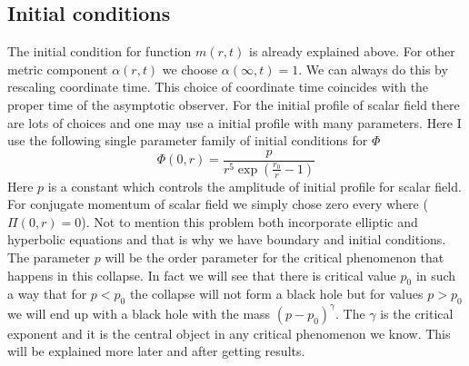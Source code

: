 \documentclass[a4paper,11pt]{article}
\begin{document}
\subsection{Initial conditions}
The initial condition for function $m(r,t)$ is already explained above. For other metric component $\alpha(r,t)$ we choose $\alpha(\infty,t)=1$. We can always do this by rescaling coordinate time. This choice of coordinate time coincides with the proper time of the asymptotic observer. For the initial profile of scalar field there are lots of choices and one may use a initial profile with many parameters. Here I use the following single parameter family of initial conditions for $\Phi$ 
\begin{equation*}
	\Phi(0,r)=\frac{p}{r^5 \exp(\frac{r_0}{r}-1)}
\end{equation*}
Here $p$ is a constant which controls the amplitude of initial profile for scalar field. For conjugate momentum of scalar field we simply chose zero every where ($\Pi(0,r)=0$). Not to mention this problem both incorporate elliptic and hyperbolic equations and that is why we have boundary and initial conditions.
 The parameter $p$ will be the order parameter for the critical phenomenon that happens in this collapse. In fact we will see that there is critical value $p_0$ in such a way that for $p<p_0$ the collapse will not form a black hole but for values $p>p_0$ we will end up with a black hole with the mass $(p-p_0)^\gamma$. The $\gamma$ is the critical exponent and it is the central object in any critical phenomenon we know. This will be explained more later and after getting results.
\end{document}
